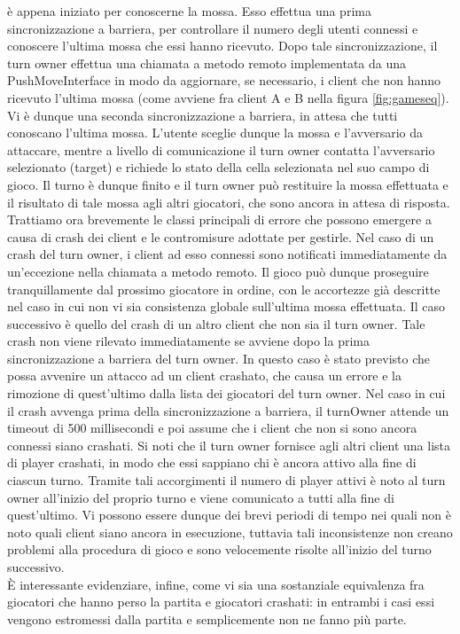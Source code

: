 è appena iniziato per conoscerne la mossa. Esso effettua una prima 
sincronizzazione a barriera, per controllare il numero degli utenti connessi e 
conoscere l'ultima mossa che essi hanno ricevuto. Dopo tale sincronizzazione, 
il turn owner effettua una chiamata a metodo remoto implementata da una 
PushMoveInterface in modo da aggiornare, se necessario, i client che non hanno 
ricevuto l'ultima mossa (come avviene fra client A e B nella figura 
\ref{fig:gameseq}). Vi è dunque una seconda sincronizzazione a barriera, 
in attesa che tutti conoscano l'ultima mossa. L'utente sceglie dunque la 
mossa e l'avversario da attaccare, mentre a livello di comunicazione il turn 
owner contatta l'avversario selezionato (target) e richiede lo stato della 
cella selezionata nel suo campo di gioco. Il turno è dunque finito e il turn 
owner può restituire la mossa effettuata e il risultato di tale mossa agli 
altri giocatori, che sono ancora in attesa di risposta.
\\
Trattiamo ora brevemente le classi principali di errore che possono emergere a 
causa di crash dei client e le contromisure adottate per gestirle. Nel caso di 
un crash del turn owner, i client ad esso connessi sono notificati 
immediatamente da un'eccezione nella chiamata a metodo remoto. Il gioco può 
dunque proseguire tranquillamente dal prossimo giocatore in ordine, con le 
accortezze già descritte nel caso in cui non vi sia consistenza globale 
sull'ultima mossa effettuata. Il caso successivo è quello del crash di un altro 
client che non sia il turn owner. Tale crash non viene rilevato immediatamente 
se avviene dopo la prima sincronizzazione a barriera del turn owner. In questo 
caso è stato previsto che possa avvenire un attacco ad un client crashato, che 
causa un errore e la rimozione di quest'ultimo dalla lista dei giocatori del 
turn owner. Nel caso in cui il crash avvenga prima della sincronizzazione a 
barriera, il turnOwner attende un timeout di 500 %
millisecondi e poi assume che i client che non si sono ancora connessi siano 
crashati. Si noti che il turn owner fornisce agli altri client una lista di 
player crashati, in modo che essi sappiano chi è ancora attivo alla fine di 
ciascun turno. Tramite tali accorgimenti il numero di player attivi è noto al 
turn owner all'inizio del proprio turno e viene comunicato a tutti alla fine di 
quest'ultimo. Vi possono essere dunque dei brevi periodi di tempo nei quali non 
è noto quali client siano ancora in esecuzione, tuttavia tali inconsistenze non 
creano problemi alla procedura di gioco e sono velocemente risolte all'inizio 
del turno successivo.
\\
È interessante evidenziare, infine, come vi sia una sostanziale equivalenza fra 
giocatori che hanno perso la partita e giocatori crashati: in entrambi i casi 
essi vengono estromessi dalla partita e semplicemente non ne fanno più parte.